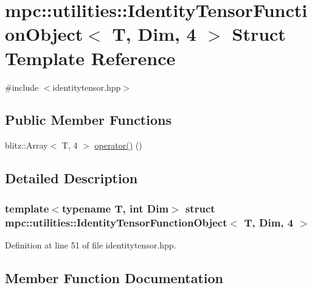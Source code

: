 \hypertarget{structmpc_1_1utilities_1_1_identity_tensor_function_object_3_01_t_00_01_dim_00_014_01_4}{}\section{mpc\+:\+:utilities\+:\+:Identity\+Tensor\+Function\+Object$<$ T, Dim, 4 $>$ Struct Template Reference}
\label{structmpc_1_1utilities_1_1_identity_tensor_function_object_3_01_t_00_01_dim_00_014_01_4}


{\ttfamily \#include $<$identitytensor.\+hpp$>$}

\subsection*{Public Member Functions}
\begin{DoxyCompactItemize}
\item 
blitz\+::\+Array$<$ T, 4 $>$ \mbox{\hyperlink{structmpc_1_1utilities_1_1_identity_tensor_function_object_3_01_t_00_01_dim_00_014_01_4_a5155400d769ac22a62537f4d3aee9cda}{operator()}} ()
\end{DoxyCompactItemize}


\subsection{Detailed Description}
\subsubsection*{template$<$typename T, int Dim$>$\newline
struct mpc\+::utilities\+::\+Identity\+Tensor\+Function\+Object$<$ T, Dim, 4 $>$}



Definition at line 51 of file identitytensor.\+hpp.



\subsection{Member Function Documentation}
\mbox{\label{structmpc_1_1utilities_1_1_identity_tensor_function_object_3_01_t_00_01_dim_00_014_01_4_a5155400d769ac22a62537f4d3aee9cda}} 
